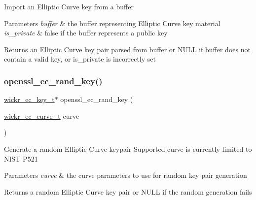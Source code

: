 Import an Elliptic Curve key from a buffer


\begin{DoxyParams}{Parameters}
{\em buffer} & the buffer representing Elliptic Curve key material \\
\hline
{\em is\+\_\+private} & false if the buffer represents a public key \\
\hline
\end{DoxyParams}
\begin{DoxyReturn}{Returns}
an Elliptic Curve key pair parsed from buffer or N\+U\+LL if buffer does not contain a valid key, or is\+\_\+private is incorrectly set 
\end{DoxyReturn}
\mbox{\label{group__openssl__crypto_ga75a01a740d558bfcc0f10920266cd9d5}} 
\subsubsection{\texorpdfstring{openssl\_ec\_rand\_key()}{openssl\_ec\_rand\_key()}}
{\footnotesize\ttfamily \mbox{\hyperlink{structwickr__ec__key}{wickr\+\_\+ec\+\_\+key\+\_\+t}}$\ast$ openssl\+\_\+ec\+\_\+rand\+\_\+key (\begin{DoxyParamCaption}\item[{\mbox{\hyperlink{structwickr__ec__curve}{wickr\+\_\+ec\+\_\+curve\+\_\+t}}}]{curve }\end{DoxyParamCaption})}

Generate a random Elliptic Curve keypair Supported curve is currently limited to N\+I\+ST P521


\begin{DoxyParams}{Parameters}
{\em curve} & the curve parameters to use for random key pair generation \\
\hline
\end{DoxyParams}
\begin{DoxyReturn}{Returns}
a random Elliptic Curve key pair or N\+U\+LL if the random generation fails 
\end{DoxyReturn}
\mbox{\label{group__openssl__crypto_gab32cef5c789ee1992afae98a81b65823}} 
